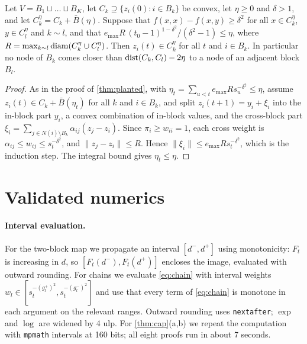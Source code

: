 \begin{proposition}\label{prop:separation}
Let $V=B_1\sqcup\dots\sqcup B_K$, let $C_k\supseteq\{z_i(0):i\in B_k\}$ be convex, let $\eta\ge0$ and $\delta>1$, and let $C_k^\eta=C_k+\bar B(\eta)$.
Suppose that $f(x,x)-f(x,y)\ge\delta^2$ for all $x\in C_k^\eta$, $y\in C_l^\eta$ and $k\sim l$, and that
$e_{\max}R\,(t_0-1)^{1-\delta^2}/(\delta^2-1)\le\eta$, where $R=\max_{k\sim l}\operatorname{diam}(C_k^\eta\cup C_l^\eta)$. Then $z_i(t)\in C_k^\eta$ for all $t$ and
$i\in B_k$. In particular no node of $B_k$ comes closer than $\operatorname{dist}(C_k,C_l)-2\eta$ to a node of an adjacent block $B_l$.
\end{proposition}

\begin{proof}
As in the proof of \cref{thm:planted}, with $\eta_t=\sum_{u<t}e_{\max}Rs_u^{-\delta^2}\le\eta$, assume $z_i(t)\in C_k+\bar B(\eta_t)$ for all $k$ and
$i\in B_k$, and split $z_i(t+1)=y_i+\xi_i$ into the in-block part $y_i$, a convex combination of in-block values, and the cross-block part
$\xi_i=\sum_{j\in N(i)\setminus B_k}\alpha_{ij}(z_j-z_i)$. Since $\pi_i\ge w_{ii}=1$, each cross weight is $\alpha_{ij}\le w_{ij}\le s_t^{-\delta^2}$, and
$\|z_j-z_i\|\le R$. Hence $\|\xi_i\|\le e_{\max}Rs_t^{-\delta^2}$, which is the induction step. The integral bound gives $\eta_t\le\eta$.
\end{proof}

\section{Validated numerics}\label{app:numerics}

\paragraph{Interval evaluation.} For the two-block map we propagate an interval $[d^-,d^+]$ using monotonicity: $F_t$ is increasing in $d$,
so $[F_t(d^-),F_t(d^+)]$ encloses the image, evaluated with outward rounding. For chains we evaluate \eqref{eq:chain} with interval weights
$w_l\in[s_t^{-(g_l^+)^2},s_t^{-(g_l^-)^2}]$ and use that every term of \eqref{eq:chain} is monotone in each argument on the relevant ranges.
Outward rounding uses \texttt{nextafter}; $\exp$ and $\log$ are widened by 4 ulp. For \cref{thm:cap}(a,b) we repeat the computation with
\texttt{mpmath} intervals at 160 bits; all eight proofs run in about 7 seconds.

